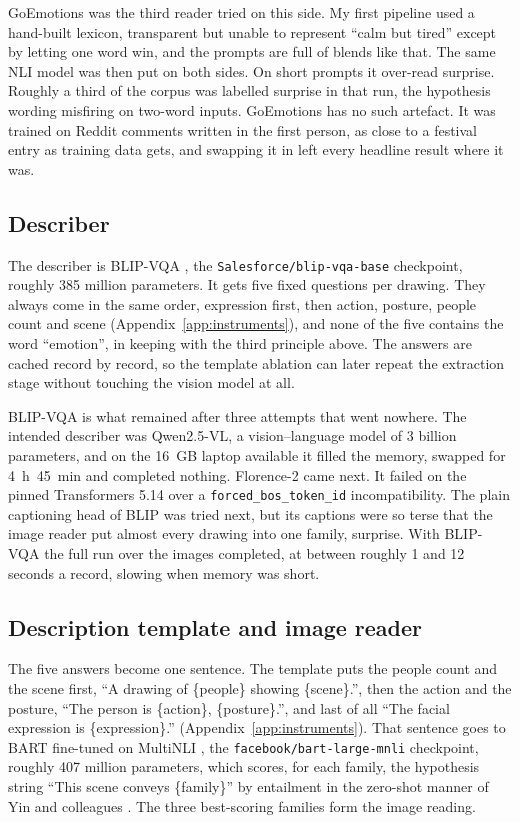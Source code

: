GoEmotions was the third reader tried on this side. My first pipeline used a hand-built lexicon, transparent but unable to represent ``calm but tired'' except by letting one word win, and the prompts are full of blends like that. The same NLI model was then put on both sides. On short prompts it over-read surprise. Roughly a third of the corpus was labelled surprise in that run, the hypothesis wording misfiring on two-word inputs. GoEmotions has no such artefact. It was trained on Reddit comments written in the first person, as close to a festival entry as training data gets, and swapping it in left every headline result where it was.

\subsection{Describer}

The describer is BLIP-VQA \cite{li2022blip}, the \texttt{Salesforce/blip-vqa-base} checkpoint, roughly 385 million parameters. It gets five fixed questions per drawing. They always come in the same order, expression first, then action, posture, people count and scene (Appendix~\ref{app:instruments}), and none of the five contains the word ``emotion'', in keeping with the third principle above. The answers are cached record by record, so the template ablation can later repeat the extraction stage without touching the vision model at all.

BLIP-VQA is what remained after three attempts that went nowhere. The intended describer was Qwen2.5-VL, a vision--language model of 3 billion parameters, and on the 16~GB laptop available it filled the memory, swapped for 4~h~45~min and completed nothing. Florence-2 came next. It failed on the pinned Transformers 5.14 over a \texttt{forced\_bos\_token\_id} incompatibility. The plain captioning head of BLIP was tried next, but its captions were so terse that the image reader put almost every drawing into one family, surprise. With BLIP-VQA the full run over the \nTotal{} images completed, at between roughly 1 and 12 seconds a record, slowing when memory was short.

\subsection{Description template and image reader}

The five answers become one sentence. The template puts the people count and the scene first, ``A drawing of \{people\} showing \{scene\}.'', then the action and the posture, ``The person is \{action\}, \{posture\}.'', and last of all ``The facial expression is \{expression\}.'' (Appendix~\ref{app:instruments}). That sentence goes to BART fine-tuned on MultiNLI \cite{lewis2020bart, williams2018broad}, the \texttt{facebook/bart-large-mnli} checkpoint, roughly 407 million parameters, which scores, for each family, the hypothesis string ``This scene conveys \{family\}'' by entailment in the zero-shot manner of Yin and colleagues \cite{yin2019benchmarking}. The three best-scoring families form the image reading.

